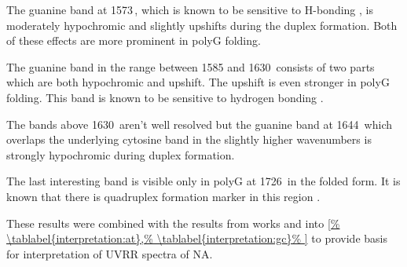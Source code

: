 The guanine band at 1573\,\icm{}, which is known to be sensitive to H-bonding
\parencite{Palacky2013}, is moderately hypochromic and slightly upshifts
during the duplex formation. Both of these effects are more prominent in
polyG folding.

The guanine band in the range between 1585 and 1630\,\icm{} consists of two
parts which are both hypochromic and upshift.
The upshift is even stronger in polyG folding.
This band is known to be sensitive to hydrogen bonding
\parencite{Miura1995}.

The bands above 1630\,\icm{} aren't well resolved but the guanine band at
1644\,\icm{} which overlaps the underlying cytosine band in the slightly
higher wavenumbers is strongly hypochromic during duplex formation.

The last interesting band is visible only in polyG at 1726\,\icm{} in the
folded form.
It is known that there is quadruplex formation marker in this region
\parencite{Palacky2013}.

These results were combined with the results from works
\textcite{Klener2015}
and
\textcite{Klener2021}
into
\cref{%
	\tablabel{interpretation:at},%
	\tablabel{interpretation:gc}%
}
to provide basis for interpretation of UVRR spectra of NA.

